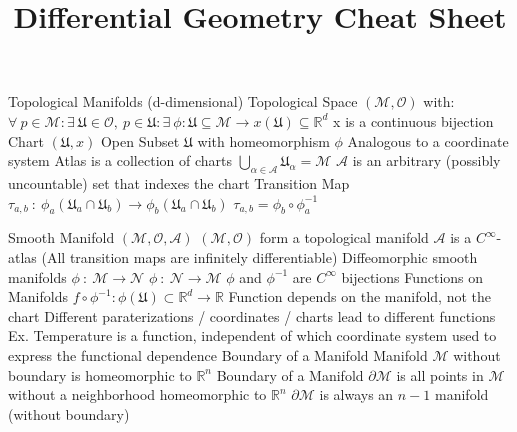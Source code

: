 \documentclass[14pt]{extarticle}
\title{Differential Geometry Cheat Sheet}
\begin{document}
	\maketitle
	\begin{outline}
		\1	Topological Manifolds (d-dimensional)
			\2	Topological Space $(\mathcal{M},\mathcal{O})$ with:
				\3	$\forall~p\in \mathcal{M}:\exists~\mathfrak{U} \in \mathcal{O},~
						 p \in \mathfrak{U} :\exists~\phi:\mathfrak{U} \subseteq \mathcal{M} 
						 \rightarrow x(\mathfrak{U}) \subseteq \mathbb{R}^d$
				\3	x is a continuous bijection
			\2	Chart $(\mathfrak{U},x)$
				\3	Open Subset $\mathfrak{U}$ with homeomorphism $\phi$
				\3	Analogous to a coordinate system
			\2	Atlas is a collection of charts
				\3	$\bigcup_{\alpha \in \mathcal{A}} \mathfrak{U}_{\alpha} = \mathcal{M}$
				\3	$\mathcal{A}$ is an arbitrary (possibly uncountable) set that indexes the chart
			\2	Transition Map
				\3	$\tau_{a,b}~:~\phi_a(\mathfrak{U}_a \cap \mathfrak{U}_b) \rightarrow
							\phi_b(\mathfrak{U}_a \cap \mathfrak{U}_b)$
				\3	$\tau_{a,b} = \phi_b \circ \phi_a^{-1}$
	
		\1	Smooth Manifold $(\mathcal{M},\mathcal{O},\mathcal{A})$
			\2	$(\mathcal{M},\mathcal{O})$ form a topological manifold
			\2	$\mathcal{A}$ is a $C^{\infty}$-atlas (All transition maps are infinitely differentiable)
			\2	Diffeomorphic smooth manifolds
				\3	$\phi~:~\mathcal{M} \rightarrow \mathcal{N}$
				\3	$\phi~:~\mathcal{N} \rightarrow \mathcal{M}$
				\3	$\phi$ and $\phi^{-1}$ are $C^{\infty}$ bijections
			\2	Functions on Manifolds
				\3	$f \circ \phi^{-1} : \phi(\mathfrak{U}) \subset \mathbb{R}^d \rightarrow \mathbb{R}$
				\3	Function depends on the manifold, not the chart
				\3	Different paraterizations / coordinates / charts lead to different functions
				\3	Ex. Temperature is a function, independent of which coordinate system used to express the functional dependence
			\2	Boundary of a Manifold
				\3	Manifold $\mathcal{M}$ without boundary is homeomorphic to $\mathbb{R}^n$
				\3	Boundary of a Manifold $\partial \mathcal{M}$ is all points 
						in $\mathcal{M}$ without a neighborhood homeomorphic to $\mathbb{R}^n$
				\3	$\partial \mathcal{M}$ is always an $n-1$ manifold (without boundary)
					

\end{outline}
\end{document}
